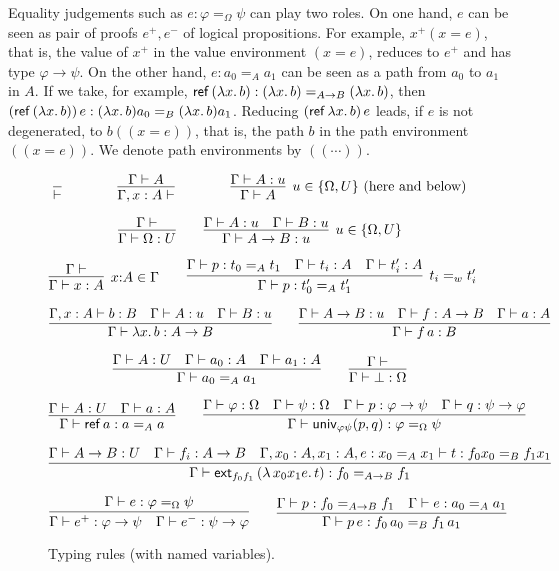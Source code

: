 \documentclass[10pt,a4paper]{article}
\newcommand{\lam}[2]{\lambda{#1.\,#2}}
\newcommand{\pbr}[1]{(\!(#1)\!)}
\newcommand{\set}[1]{\{#1\}}
\newcommand{\unphsi}{{\univ_{\varphi\psi}}}
\newcommand{\extfs}{{\ext_{f_0 f_1}}}
\newcommand{\Ref}{{\sf ref}}
\newcommand{\ext}{{\sf ext}}
\newcommand{\univ}{{\sf univ}}
\begin{document}
Equality judgements such as $e: \varphi =_\Omega \psi$ can play two roles.
On one hand, $e$ can be seen as pair of proofs $e^+,e^-$ of logical propositions.
For example, $x^+(x{=}e)$, that is, 
the value of $x^+$ in the value environment $(x{=}e)$, 
reduces to $e^+$ and has type $\varphi\to\psi$. 
On the other hand, $e: a_0 =_A a_1$ can be seen as a path from $a_0$
to $a_1$ in $A$. If we take, for example, 
$\Ref\,(\lambda x.\,b) : (\lambda x.\,b) =_{A\to B} (\lambda x.\,b)$, then 
$(\Ref\,(\lambda x.\,b))\,e : (\lambda x.\,b) a_0 =_B (\lambda x.\,b) a_1$. 
Reducing $(\Ref\,\lambda x.\,b)\,e$ leads, if $e$ is not degenerated, 
to $b\pbr{x{=}e}$, that is, the path $b$ in the path environment $\pbr{x{=}e}$.
We denote path environments by $\pbr{\cdots}$.

\begin{figure}[h]
\[ \infer{\vdash}{} \quad\quad\quad\quad
\infer{\Gamma,x:A\vdash}{\Gamma\vdash A} \quad\quad\quad\quad
\infer[u\in\set{\Omega,U}~\text{(here and below)}]{\Gamma\vdash A}{\Gamma\vdash A:u} \]

\[ 
\infer{\Gamma\vdash{\Omega:U}}{\Gamma\vdash} \quad\quad
\infer[u\in\set{\Omega,U}]{\Gamma\vdash {A}\to{B} :u}{\Gamma\vdash A:u\quad\Gamma\vdash B:u}
\]

\[
\infer[x{:}A \in\Gamma]{\Gamma\vdash x:A}{\Gamma\vdash} \quad\quad
\infer[t_i =_{w} t'_i]{\Gamma\vdash p: t'_0 =_A t'_1}
{\Gamma\vdash p: t_0 =_A t_1 \quad \Gamma\vdash t_i : A \quad \Gamma\vdash t'_i : A }
\]

\[ 
\infer{\Gamma\vdash\lam{x}{b}:{A}\to{B}}
{\Gamma,x:A\vdash b:B \quad \Gamma \vdash A:u \quad \Gamma \vdash B:u} 
\quad\quad
\infer{\Gamma\vdash f\,a:B}
{\Gamma\vdash {A}\to{B}:u\quad\Gamma\vdash f:{A}\to{B}\quad\Gamma\vdash a:A} 
\]

\[
\infer{\Gamma\vdash a_0 =_A a_1}
{\Gamma\vdash A:U \quad \Gamma\vdash a_0:A \quad \Gamma\vdash a_1:A}\quad\quad
\infer{\Gamma\vdash \bot:\Omega}{\Gamma\vdash}
\]

\[ 
\infer{\Gamma\vdash\Ref\,a: a =_A a}{\Gamma\vdash A:U \quad \Gamma\vdash a:A} 
\quad\quad
\infer{\Gamma\vdash\unphsi(p,q):\varphi =_\Omega \psi}
{\Gamma\vdash \varphi:\Omega\quad \Gamma\vdash \psi:\Omega\quad
\Gamma\vdash p:\varphi\to\psi\quad \Gamma\vdash q:\psi\to\varphi} 
\]

\[
\infer{\Gamma\vdash \extfs\,(\lambda\,x_0 x_1 e.\,t): f_0 =_{A\to B} f_1}
{\Gamma\vdash A\to B :U \quad\Gamma\vdash f_i: A\to B \quad
\Gamma,x_0:A,x_1:A,e: x_0 =_A x_1 \vdash t: f_0 x_0 =_B f_1 x_1} 
\]

\[
\infer{\Gamma\vdash e^+: \varphi\to\psi \quad \Gamma\vdash e^-: \psi\to\varphi} 
{\Gamma\vdash e: \varphi =_{\Omega} \psi}
\quad\quad
\infer{\Gamma\vdash p\,e: f_0\,a_0 =_B f_1\,a_1} 
  {\Gamma\vdash p: f_0 =_{A\to B} f_1 \quad \Gamma\vdash e : a_0 =_A a_1}
\]
\caption{Typing rules (with named variables).
\label{typing_rules}}
\end{figure}
\end{document}
